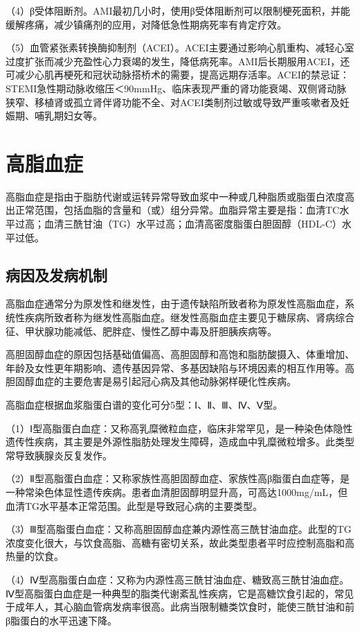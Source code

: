 （4）β受体阻断剂。AMI最初几小时，使用β受体阻断剂可以限制梗死面积，并能缓解疼痛，减少镇痛剂的应用，对降低急性期病死率有肯定疗效。

（5）血管紧张素转换酶抑制剂（ACEI）。ACEI主要通过影响心肌重构、减轻心室过度扩张而减少充盈性心力衰竭的发生，降低病死率。AMI后长期服用ACEI，还可减少心肌再梗死和冠状动脉搭桥术的需要，提高远期存活率。ACEI的禁忌证：STEMI急性期动脉收缩压＜90mmHg、临床表现严重的肾功能衰竭、双侧肾动脉狭窄、移植肾或孤立肾伴肾功能不全、对ACEI类制剂过敏或导致严重咳嗽者及妊娠期、哺乳期妇女等。

\section{高脂血症}

高脂血症是指由于脂肪代谢或运转异常导致血浆中一种或几种脂质或脂蛋白浓度高出正常范围，包括血脂的含量和（或）组分异常。血脂异常主要是指：血清TC水平过高；血清三酰甘油（TG）水平过高；血清高密度脂蛋白胆固醇（HDL-C）水平过低。

\subsection{病因及发病机制}

高脂血症通常分为原发性和继发性，由于遗传缺陷所致者称为原发性高脂血症，系统性疾病所致者称为继发性高脂血症。继发性高脂血症主要见于糖尿病、肾病综合征、甲状腺功能减低、肥胖症、慢性乙醇中毒及肝胆胰疾病等。

高胆固醇血症的原因包括基础值偏高、高胆固醇和高饱和脂肪酸摄入、体重增加、年龄及女性更年期影响、遗传基因异常、多基因缺陷与环境因素的相互作用等。高胆固醇血症的主要危害是易引起冠心病及其他动脉粥样硬化性疾病。

高脂血症根据血浆脂蛋白谱的变化可分5型：Ⅰ、Ⅱ、Ⅲ、Ⅳ、Ⅴ型。

（1）Ⅰ型高脂蛋白血症：又称高乳糜微粒血症，临床非常罕见，是一种染色体隐性遗传性疾病，其主要是外源性脂肪处理发生障碍，造成血中乳糜微粒增多。此类型常导致胰腺炎反复发作。

（2）Ⅱ型高脂蛋白血症：又称家族性高胆固醇血症、家族性高β脂蛋白血症等，是一种常染色体显性遗传疾病。患者血清胆固醇明显升高，可高达1000mg/mL，但血清TG水平基本正常范围。此型是导致冠心病的主要类型。

（3）Ⅲ型高脂蛋白血症：又称高胆固醇血症兼内源性高三酰甘油血症。此型的TG浓度变化很大，与饮食高脂、高糖有密切关系，故此类型患者平时应控制高脂和高热量的饮食。

（4）Ⅳ型高脂蛋白血症：又称为内源性高三酰甘油血症、糖致高三酰甘油血症。Ⅳ型高脂蛋白血症是一种典型的脂类代谢紊乱性疾病，它是高糖饮食引起的，常见于成年人，其心脑血管病发病率很高。此病当限制糖类饮食时，能使三酰甘油和前β脂蛋白的水平迅速下降。

